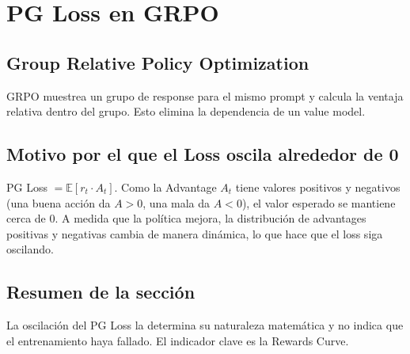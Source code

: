 \section{PG Loss en GRPO}
\subsection{Group Relative Policy Optimization}
GRPO muestrea un grupo de response para el mismo prompt y calcula la ventaja relativa dentro del grupo. Esto elimina la dependencia de un value model.

\subsection{Motivo por el que el Loss oscila alrededor de 0}
PG Loss $= \mathbb{E}[r_t \cdot A_t]$. Como la Advantage $A_t$ tiene valores positivos y negativos (una buena acción da $A > 0$, una mala da $A < 0$), el valor esperado se mantiene cerca de 0. A medida que la política mejora, la distribución de advantages positivas y negativas cambia de manera dinámica, lo que hace que el loss siga oscilando.

\subsection{Resumen de la sección}
La oscilación del PG Loss la determina su naturaleza matemática y no indica que el entrenamiento haya fallado. El indicador clave es la Rewards Curve.

